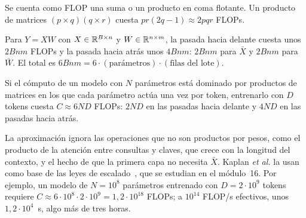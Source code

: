 Se cuenta como FLOP una suma o un producto en coma flotante. Un producto de matrices $(p\times q)(q\times r)$ cuesta $pr(2q-1)\approx 2pqr$ FLOPs.

\begin{proposicion}\label{prop:flops}
Para $Y=XW$ con $X\in\mathbb{R}^{B\times n}$ y $W\in\mathbb{R}^{n\times m}$, la pasada hacia delante cuesta unos $2Bnm$ FLOPs y la pasada hacia atrás unos $4Bnm$: $2Bnm$ para $\bar X$ y $2Bnm$ para $\bar W$. El total es $6Bnm=6\cdot(\text{parámetros})\cdot(\text{filas del lote})$.
\end{proposicion}

\begin{corolario}[Regla $6ND$]\label{cor:6nd}
Si el cómputo de un modelo con $N$ parámetros está dominado por productos de matrices en los que cada parámetro actúa una vez por token, entrenarlo con $D$ tokens cuesta $C\approx 6ND$ FLOPs: $2ND$ en las pasadas hacia delante y $4ND$ en las pasadas hacia atrás.
\end{corolario}

La aproximación ignora las operaciones que no son productos por pesos, como el producto de la atención entre consultas y claves, que crece con la longitud del contexto, y el hecho de que la primera capa no necesita $\bar X$. Kaplan \emph{et al.} la usan como base de las leyes de escalado~\cite{kaplan}, que se estudian en el módulo~16. Por ejemplo, un modelo de $N=10^{8}$ parámetros entrenado con $D=2\cdot 10^{9}$ tokens requiere $C\approx 6\cdot 10^{8}\cdot 2\cdot 10^{9}=1{,}2\cdot 10^{18}$ FLOPs; a $10^{14}$ FLOP/s efectivos, unos $1{,}2\cdot 10^{4}$~s, algo más de tres horas.

